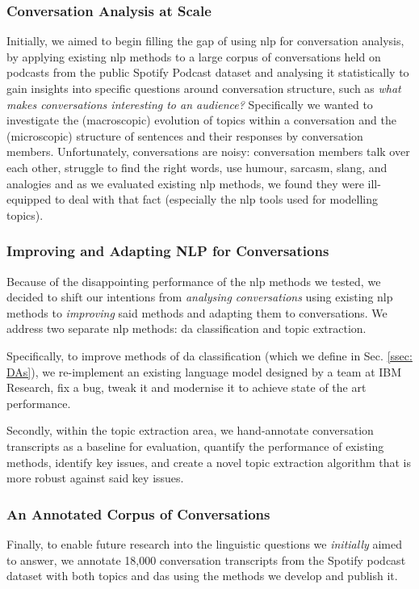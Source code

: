 \subsubsection{Conversation Analysis at Scale}
Initially, we aimed to begin filling the gap of using \gls{nlp} for conversation analysis, by applying existing \gls{nlp} methods to a large corpus of conversations held on podcasts from the public Spotify Podcast dataset\cite{clifton-2020100000} and analysing it statistically to gain insights into specific questions around conversation structure, such as \textit{what makes conversations interesting to an audience?} Specifically we wanted to investigate the (macroscopic) evolution of topics within a conversation and the (microscopic) structure of sentences and their responses by conversation members. Unfortunately, conversations are noisy: conversation members talk over each other, struggle to find the right words, use humour, sarcasm, slang, and analogies and as we evaluated existing \gls{nlp} methods, we found they were ill-equipped to deal with that fact (especially the \gls{nlp} tools used for modelling topics).

\subsubsection{Improving and Adapting NLP for Conversations}
Because of the disappointing performance of the \gls{nlp} methods we tested, we decided to shift our intentions from \textit{analysing conversations} using existing \gls{nlp} methods to \textit{improving} said methods and adapting them to conversations. We address two separate \gls{nlp} methods: \gls{da} classification and topic extraction.

Specifically, to improve methods of \gls{da} classification (which we define in Sec. \ref{ssec: DAs}), we re-implement an existing language \gls{model} designed by a team at IBM Research\cite{kumar2017dialogue}, fix a bug, tweak it and modernise it to achieve state of the art performance.

Secondly, within the topic extraction area, we hand-annotate conversation transcripts as a baseline for evaluation, quantify the performance of existing methods, identify key issues, and create a novel topic extraction algorithm that is more robust against said key issues.

\subsubsection{An Annotated Corpus of Conversations}
Finally, to enable future research into the linguistic questions we \textit{initially} aimed to answer, we annotate 18,000 conversation transcripts from the Spotify podcast dataset\cite{clifton-2020100000} with both topics and \glspl{da} using the methods we develop and publish it.

